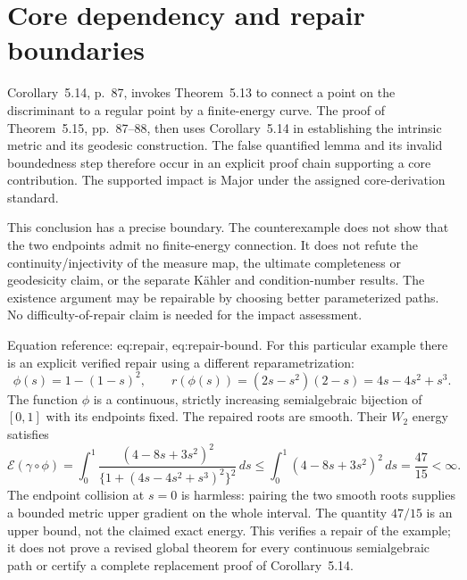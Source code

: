 \documentclass[10pt]{article}
\begin{document}
\section*{Core dependency and repair boundaries}
Corollary 5.14, p. 87, invokes Theorem 5.13 to connect a point on the discriminant to a regular point by a finite-energy curve. The proof of Theorem 5.15, pp. 87–88, then uses Corollary 5.14 in establishing the intrinsic metric and its geodesic construction. The false quantified lemma and its invalid boundedness step therefore occur in an explicit proof chain supporting a core contribution. The supported impact is Major under the assigned core-derivation standard.\par
This conclusion has a precise boundary. The counterexample does not show that the two endpoints admit no finite-energy connection. It does not refute the continuity/injectivity of the measure map, the ultimate completeness or geodesicity claim, or the separate Kähler and condition-number results. The existence argument may be repairable by choosing better parameterized paths. No difficulty-of-repair claim is needed for the impact assessment.\par
Equation reference: eq:repair, eq:repair-bound. For this particular example there is an explicit verified repair using a different reparametrization: \[
 \phi(s)=1-(1-s)^2,\qquad
 r(\phi(s))=(2s-s^2)(2-s)=4s-4s^2+s^3 .\] The function \(\phi\) is a continuous, strictly increasing semialgebraic bijection of \([0,1]\) with its endpoints fixed. The repaired roots are smooth. Their \(W_2\) energy satisfies \[
 \mathcal E(\gamma\circ\phi)
 =\int_0^1\frac{(4-8s+3s^2)^2}
 {\{1+(4s-4s^2+s^3)^2\}^{2}}\,ds
 \leq\int_0^1(4-8s+3s^2)^2\,ds
 =\frac{47}{15}<\infty .\] The endpoint collision at \(s=0\) is harmless: pairing the two smooth roots supplies a bounded metric upper gradient on the whole interval. The quantity \(47/15\) is an upper bound, not the claimed exact energy. This verifies a repair of the example; it does not prove a revised global theorem for every continuous semialgebraic path or certify a complete replacement proof of Corollary 5.14.\par
\end{document}
